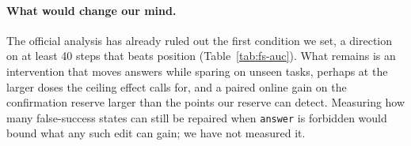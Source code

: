\paragraph{What would change our mind.} The official analysis has already ruled out the first condition we set, a direction on at least 40 \fsp{} steps that beats position (Table~\ref{tab:fs-auc}). What remains is an intervention that moves \fsp{} answers while sparing \fsm{} on unseen tasks, perhaps at the larger doses the ceiling effect calls for, and a paired online gain on the confirmation reserve larger than the \onMde{} points our reserve can detect. Measuring how many false-success states can still be repaired when \texttt{answer} is forbidden would bound what any such edit can gain; we have not measured it. %
